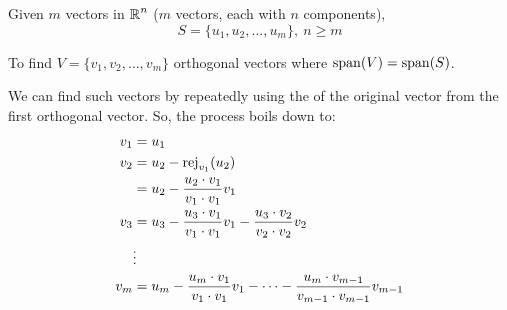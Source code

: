 \begin{theorem}\label{thm:Gram-Schmidt_Orthogonalization}
  Given $m$  vectors in $\RealNumbers^{n}$ ($m$ vectors, each with $n$ components),
  \begin{equation*}
    S = \lbrace u_{1}, u_{2}, \ldots, u_{m} \rbrace, \: n \geq m
  \end{equation*}

  To find $V = \lbrace v_{1}, v_{2}, \ldots, v_{m} \rbrace$ orthogonal vectors where $\Span(V) = \Span(S)$.

  We can find such vectors by repeatedly using the  of the original vector from the first orthogonal vector.
  So, the process boils down to:
  \begin{equation}\label{eq:Gram-Schmidt_Orthogonalization}
    \begin{aligned}
      v_{1} &= u_{1} \\
      v_{2} &= u_{2} - \Rej{u_{2}}{v_{1}} \\
      &= u_{2} - \frac{u_{2} \cdot v_{1}}{v_{1} \cdot v_{1}} v_{1} \\
      v_{3} &= u_{3} - \frac{u_{3} \cdot v_{1}}{v_{1} \cdot v_{1}} v_{1} - \frac{u_{3} \cdot v_{2}}{v_{2} \cdot v_{2}} v_{2} \\
      &\vdots \\
      v_{m} &= u_{m} - \frac{u_{m} \cdot v_{1}}{v_{1} \cdot v_{1}} v_{1} - \cdots - \frac{u_{m} \cdot v_{m-1}}{v_{m-1} \cdot v_{m-1}} v_{m-1}
    \end{aligned}
  \end{equation}
\end{theorem}


